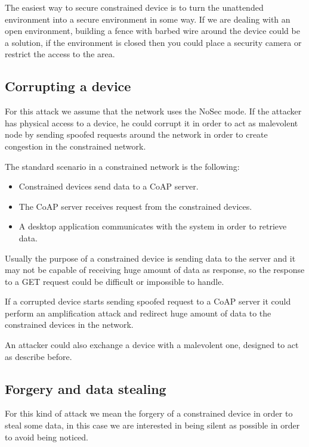	The easiest way to secure constrained device is to turn the unattended environment into a secure environment in some way. If we are dealing with an open environment, building a fence with barbed wire around the device could be a solution, if the environment is closed then you could place a security camera or restrict the access to the area.\newline
	
	\subsection{Corrupting a device}
	For this attack we assume that the network uses the NoSec mode.\newline
	If the attacker has physical access to a device, he could corrupt it in order to act as malevolent node by sending spoofed requests around the network in order to create congestion in the constrained network.\newline
	
	The standard scenario in a constrained network is the following:
	\begin{itemize}
		\item Constrained devices send data to a CoAP server.
		\item The CoAP server receives request from the constrained devices.
		\item A desktop application communicates with the system in order to retrieve data.
	\end{itemize}

	Usually the purpose of a constrained device is sending data to the server and it may not be capable of receiving huge amount of data as response, so the response to a GET request could be difficult or impossible to handle.\newline
	
	If a corrupted device starts sending spoofed request to a CoAP server it could perform an amplification attack and redirect huge amount of data to the constrained devices in the network.\newline
	
	An attacker could also exchange a device with a malevolent one, designed to act as describe before.\newline
	
	\subsection{Forgery and data stealing}
	For this kind of attack we mean the forgery of a constrained device in order to steal some data, in this case we are interested in being silent as possible in order to avoid being noticed.\newline
	
